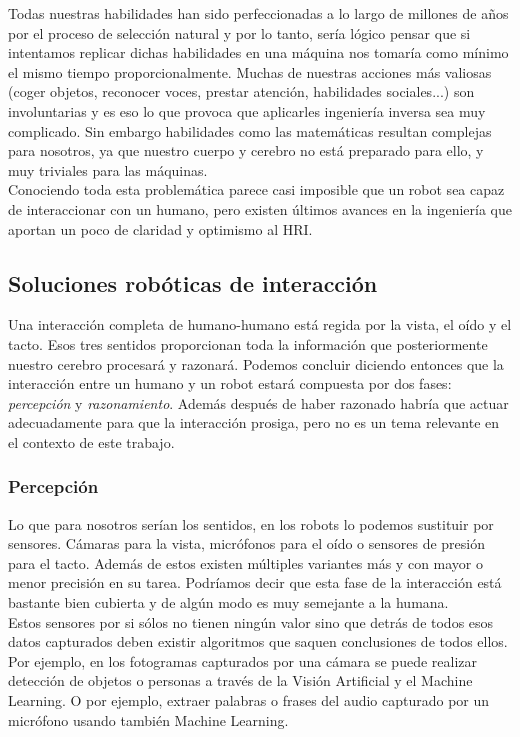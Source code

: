 Todas nuestras habilidades han sido perfeccionadas a lo largo de millones de años por el proceso de selección natural y por lo tanto, sería lógico pensar que si intentamos replicar dichas habilidades en una máquina nos tomaría como mínimo el mismo tiempo proporcionalmente. Muchas de nuestras acciones más valiosas (coger objetos, reconocer voces, prestar atención, habilidades sociales...) son involuntarias y es eso lo que provoca que aplicarles ingeniería inversa sea muy complicado. Sin embargo habilidades como las matemáticas resultan complejas para nosotros, ya que nuestro cuerpo y cerebro no está preparado para ello, y muy triviales para las máquinas.\\

Conociendo toda esta problemática parece casi imposible que un robot sea capaz de interaccionar con un humano, pero existen últimos avances en la ingeniería que aportan un poco de claridad y optimismo al HRI.

\subsection{Soluciones robóticas de interacción}

Una interacción completa de humano-humano está regida por la vista, el oído y el tacto. Esos tres sentidos proporcionan toda la información que posteriormente nuestro cerebro procesará y razonará. Podemos concluir diciendo entonces que la interacción entre un humano y un robot estará compuesta por dos fases: \textit{percepción} y \textit{razonamiento}. Además después de haber razonado habría que actuar adecuadamente para que la interacción prosiga, pero no es un tema relevante en el contexto de este trabajo. 

\subsubsection{Percepción} 

Lo que para nosotros serían los sentidos, en los robots lo podemos sustituir por sensores. Cámaras para la vista, micrófonos para el oído o sensores de presión para el tacto. Además de estos existen múltiples variantes más y con mayor o menor precisión en su tarea. Podríamos decir que esta fase de la interacción está bastante bien cubierta y de algún modo es muy semejante a la humana.\\

Estos sensores por si sólos no tienen ningún valor sino que detrás de todos esos datos capturados deben existir algoritmos que saquen conclusiones de todos ellos. Por ejemplo, en los fotogramas capturados por una cámara se puede realizar detección de objetos o personas a través de la Visión Artificial y el Machine Learning. O por ejemplo, extraer palabras o frases del audio capturado por un micrófono usando también Machine Learning.\\

